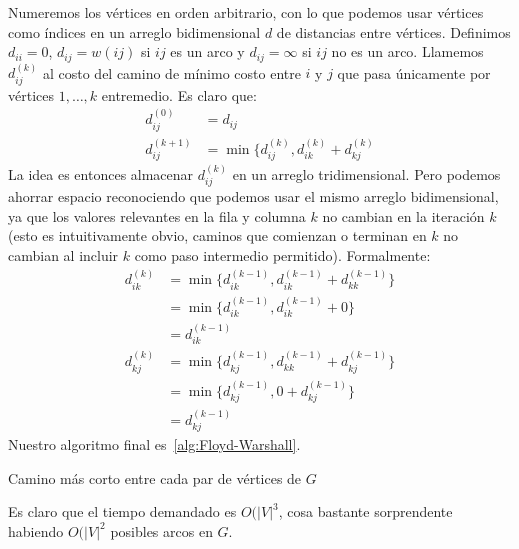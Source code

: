   Numeremos los vértices en orden arbitrario,
  con lo que podemos usar vértices
  como índices en un arreglo bidimensional \(d\)
  de distancias entre vértices.
  Definimos \(d_{i i} = 0\),
  \(d_{i j} = w(i j)\) si \(i j\) es un arco
  y \(d_{i j} = \infty\) si \(i j\) no es un arco.
  Llamemos \(d^{(k)}_{i j}\)
  al costo del camino de mínimo costo entre \(i\) y \(j\)
  que pasa únicamente por vértices \(1, \dotsc, k\) entremedio.
  Es claro que:
  \begin{align*}
    d^{(0)}_{i j}
      &= d_{i j} \\
    d^{(k + 1)}_{i j}
      &= \min\{ d^{(k)}_{i j}, d^{(k)}_{i k} + d^{(k)}_{k j}
  \end{align*}
  La idea es entonces almacenar \(d^{(k)}_{i j}\) en un arreglo tridimensional.
  Pero podemos ahorrar espacio reconociendo
  que podemos usar el mismo arreglo bidimensional,
  ya que los valores relevantes en la fila y columna \(k\)
  no cambian en la iteración \(k\)
  (esto es intuitivamente obvio,
   caminos que comienzan o terminan en \(k\) no cambian al incluir \(k\)
   como paso intermedio permitido).
  Formalmente:
  \begin{align*}
    d^{(k)}_{i k}
      &= \min\{d^{(k - 1)}_{i k}, d^{(k - 1)}_{i k} + d^{(k - 1)}_{k k}\} \\
      &= \min\{d^{(k - 1)}_{i k}, d^{(k - 1)}_{i k} + 0\} \\
      &= d^{(k - 1)}_{i k} \\
    d^{(k)}_{k j}
      &= \min\{d^{(k - 1)}_{k j}, d^{(k - 1)}_{k k} + d^{(k - 1)}_{k j}\} \\
      &= \min\{d^{(k - 1)}_{k j}, 0 + d^{(k - 1)}_{k j}\} \\
      &= d^{(k - 1)}_{k j}
  \end{align*}
  Nuestro algoritmo final es~\ref{alg:Floyd-Warshall}.
  \begin{algorithm}[htbp]
    \DontPrintSemicolon\Indp

    \caption{Camino más corto entre cada par de vértices de \(G\)}
    \label{alg:Floyd-Warshall}
  \end{algorithm}
  Es claro que el tiempo demandado es \(O(\lvert V \rvert^3\),
  cosa bastante sorprendente habiendo \(O(\lvert V \rvert^2\)
  posibles arcos en \(G\).

